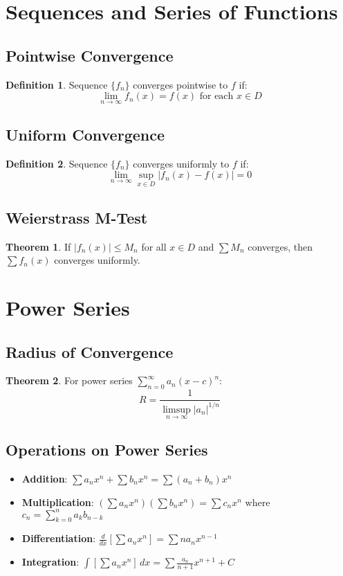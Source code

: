 \documentclass[11pt]{article}
\theoremstyle{definition}
\newtheorem{definition}{Definition}[section]
\newtheorem{theorem}{Theorem}[section]
\begin{document}
\section{Sequences and Series of Functions}

\subsection{Pointwise Convergence}
\begin{definition}
Sequence $\{f_n\}$ converges pointwise to $f$ if:
$$\lim_{n \to \infty} f_n(x) = f(x) \text{ for each } x \in D$$
\end{definition}

\subsection{Uniform Convergence}
\begin{definition}
Sequence $\{f_n\}$ converges uniformly to $f$ if:
$$\lim_{n \to \infty} \sup_{x \in D} |f_n(x) - f(x)| = 0$$
\end{definition}

\subsection{Weierstrass M-Test}
\begin{theorem}
If $|f_n(x)| \leq M_n$ for all $x \in D$ and $\sum M_n$ converges, then $\sum f_n(x)$ converges uniformly.
\end{theorem}

\section{Power Series}

\subsection{Radius of Convergence}
\begin{theorem}
For power series $\sum_{n=0}^{\infty} a_n(x-c)^n$:
$$R = \frac{1}{\limsup_{n \to \infty} |a_n|^{1/n}}$$
\end{theorem}

\subsection{Operations on Power Series}
\begin{itemize}
    \item \textbf{Addition}: $\sum a_n x^n + \sum b_n x^n = \sum (a_n + b_n) x^n$
    \item \textbf{Multiplication}: $(\sum a_n x^n)(\sum b_n x^n) = \sum c_n x^n$ where $c_n = \sum_{k=0}^n a_k b_{n-k}$
    \item \textbf{Differentiation}: $\frac{d}{dx}[\sum a_n x^n] = \sum n a_n x^{n-1}$
    \item \textbf{Integration}: $\int [\sum a_n x^n] \, dx = \sum \frac{a_n}{n+1} x^{n+1} + C$
\end{itemize}
\end{document}
